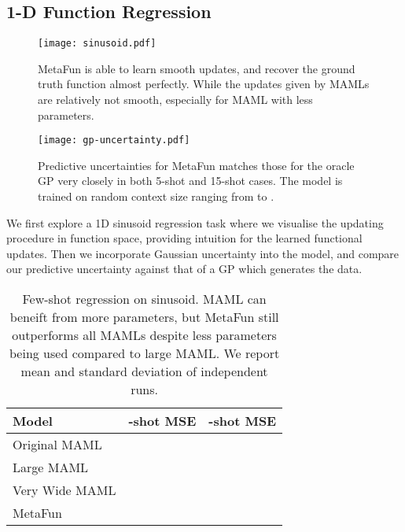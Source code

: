 \documentclass{article}
\theoremstyle{definition}
\begin{document}
\subsection{1-D Function Regression}

\begin{figure*} 
\begin{minipage}{0.49\textwidth}
    \texttt{[image: sinusoid.pdf]}
    \caption{MetaFun is able to learn smooth updates, and recover the ground truth function almost perfectly. While the updates given by \gls{MAML}s are relatively not smooth, especially for \gls{MAML} with less parameters.}
    \label{fig:sinusoid}
\end{minipage} 
\hspace{0.5cm}
\begin{minipage}{0.49\textwidth}
    \texttt{[image: gp-uncertainty.pdf]}
\caption{Predictive uncertainties for MetaFun matches those for the oracle \gls{GP} very closely in both 5-shot and 15-shot cases. The model is trained on random context size ranging from  to .}
\label{fig:gp}
\end{minipage}
\end{figure*}


We first explore a 1D sinusoid regression task where we visualise the updating procedure in function space, providing intuition for the learned functional updates. Then we incorporate Gaussian uncertainty into the model, and compare our predictive uncertainty against that of a \gls{GP} which generates the data.

\begin{table}[!ht]  
  \centering
  \footnotesize
  \caption{Few-shot regression on sinusoid. \gls{MAML} can beneift from more parameters, but MetaFun still outperforms all \gls{MAML}s despite less parameters being used compared to large \gls{MAML}. We report mean and standard deviation of  independent runs.}
  \begin{tabular}{l|cc}
    \toprule
    Model &  -shot MSE & -shot MSE \\ 
    \midrule
    Original \gls{MAML} &  &  \\
    Large \gls{MAML} &  &  \\
    Very Wide \gls{MAML}  &  &  \\
    MetaFun &  &  \\
    \bottomrule
  \end{tabular}
  \label{tb:sinusoid}
\end{table}
\end{document}
